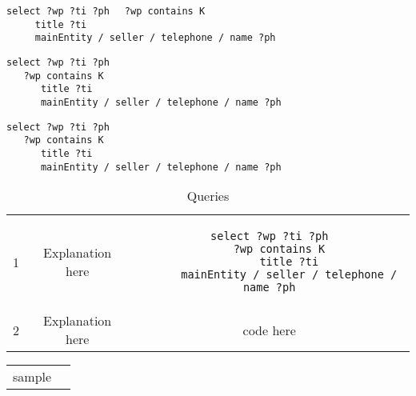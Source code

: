 \verb|select ?wp ?ti ?ph|
\verb|  ?wp contains K|\\
\verb|     title ?ti|\\
\verb|     mainEntity / seller / telephone / name ?ph|

\begin{lstlisting}
select ?wp ?ti ?ph
   ?wp contains K
      title ?ti
      mainEntity / seller / telephone / name ?ph
\end{lstlisting}

\begin{verbatim}
select ?wp ?ti ?ph
   ?wp contains K
      title ?ti
      mainEntity / seller / telephone / name ?ph
\end{verbatim}

\begin{table} 
    \begin{tabular}{ c c c }
        1 & Explanation here & 
\begin{minipage}{3in}\begin{verbatim}
select ?wp ?ti ?ph
   ?wp contains K
      title ?ti
      mainEntity / seller / telephone / name ?ph
\end{verbatim}\end{minipage}\\ 
        2 & Explanation here & code here \\ 
    \end{tabular} 
    \caption{Queries} 
\end{table}

\begin{tabular}{ ll }
sample &

\end{tabular}